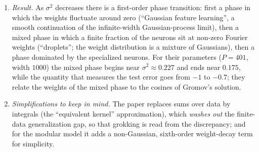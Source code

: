 \begin{beyond}
\begin{enumerate}[label=(\roman*), itemsep=0.1em, topsep=0.2em]
  \item \emph{Result.} As $\sigma^2$ decreases there is a first-order phase transition: first a phase in which the weights fluctuate around zero (``Gaussian feature learning'', a smooth continuation of the infinite-width Gaussian-process limit), then a mixed phase in which a finite fraction of the neurons sit at non-zero Fourier weights (``droplets''; the weight distribution is a mixture of Gaussians), then a phase dominated by the specialized neurons. For their parameters ($P=401$, width $1000$) the mixed phase begins near $\sigma^2\approx0.227$ and ends near $0.175$, while the quantity that measures the test error goes from $-1$ to $-0.7$; they relate the weights of the mixed phase to the cosines of Gromov's solution.
  \item \emph{Simplifications to keep in mind.} The paper replaces sums over data by integrals (the ``equivalent kernel'' approximation), which \emph{washes out} the finite-data generalization gap, so that grokking is read from the discrepancy; and for the modular model it adds a non-Gaussian, sixth-order weight-decay term for simplicity.
\end{enumerate}
\end{beyond}

